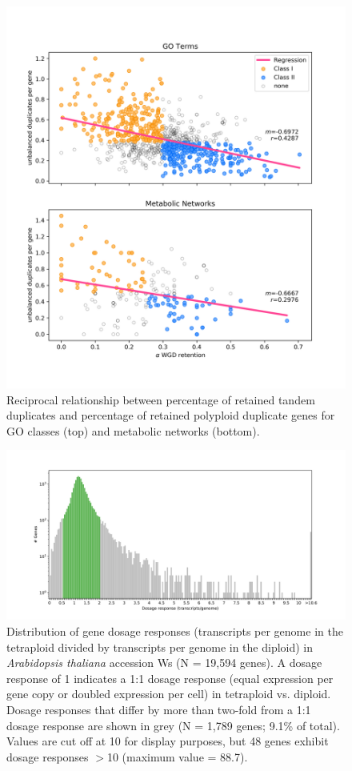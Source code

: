 \documentclass[11pt]{article}
\begin{document}
\begin{figure}[h!]
    \includegraphics[width=\linewidth]{../figures/FIG1.png}
 \caption{Reciprocal relationship between percentage of retained tandem duplicates and percentage of retained polyploid duplicate genes for GO classes (top) and metabolic networks (bottom).}
  \label{fig1}
\end{figure}



\begin{figure}[h!]
   \includegraphics[width=\linewidth]{../figures/dr_frequency_bar.png}
\caption{Distribution of gene dosage responses (transcripts per genome in the tetraploid divided by transcripts per genome in the diploid) in \textit{Arabidopsis thaliana} accession Ws (N = 19,594 genes). A dosage response of 1 indicates a 1:1 dosage response (equal expression per gene copy or doubled expression per cell) in tetraploid vs. diploid. Dosage responses that differ by more than two-fold from a 1:1 dosage response are shown in grey (N = 1,789 genes; 9.1\% of total). Values are cut off at 10 for display purposes, but 48 genes exhibit dosage responses $>$10 (maximum value = 88.7).}
 \label{fig2}
\end{figure}
\end{document}
